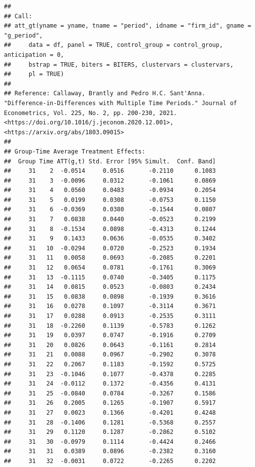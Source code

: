 \documentclass[
]{article}
\begin{document}
\begin{verbatim}
## 
## Call:
## att_gt(yname = yname, tname = "period", idname = "firm_id", gname = "g_period", 
##     data = df, panel = TRUE, control_group = control_group, anticipation = 0, 
##     bstrap = TRUE, biters = BITERS, clustervars = clustervars, 
##     pl = TRUE)
## 
## Reference: Callaway, Brantly and Pedro H.C. Sant'Anna.  "Difference-in-Differences with Multiple Time Periods." Journal of Econometrics, Vol. 225, No. 2, pp. 200-230, 2021. <https://doi.org/10.1016/j.jeconom.2020.12.001>, <https://arxiv.org/abs/1803.09015> 
## 
## Group-Time Average Treatment Effects:
##  Group Time ATT(g,t) Std. Error [95% Simult.  Conf. Band]  
##     31    2  -0.0514     0.0516       -0.2110      0.1083  
##     31    3  -0.0096     0.0312       -0.1061      0.0869  
##     31    4   0.0560     0.0483       -0.0934      0.2054  
##     31    5   0.0199     0.0308       -0.0753      0.1150  
##     31    6  -0.0369     0.0380       -0.1544      0.0807  
##     31    7   0.0838     0.0440       -0.0523      0.2199  
##     31    8  -0.1534     0.0898       -0.4313      0.1244  
##     31    9   0.1433     0.0636       -0.0535      0.3402  
##     31   10  -0.0294     0.0720       -0.2523      0.1934  
##     31   11   0.0058     0.0693       -0.2085      0.2201  
##     31   12   0.0654     0.0781       -0.1761      0.3069  
##     31   13  -0.1115     0.0740       -0.3405      0.1175  
##     31   14   0.0815     0.0523       -0.0803      0.2434  
##     31   15   0.0838     0.0898       -0.1939      0.3616  
##     31   16   0.0278     0.1097       -0.3114      0.3671  
##     31   17   0.0288     0.0913       -0.2535      0.3111  
##     31   18  -0.2260     0.1139       -0.5783      0.1262  
##     31   19   0.0397     0.0747       -0.1916      0.2709  
##     31   20   0.0826     0.0643       -0.1161      0.2814  
##     31   21   0.0088     0.0967       -0.2902      0.3078  
##     31   22   0.2067     0.1183       -0.1592      0.5725  
##     31   23  -0.1046     0.1077       -0.4378      0.2285  
##     31   24  -0.0112     0.1372       -0.4356      0.4131  
##     31   25  -0.0840     0.0784       -0.3267      0.1586  
##     31   26   0.2005     0.1265       -0.1907      0.5917  
##     31   27   0.0023     0.1366       -0.4201      0.4248  
##     31   28  -0.1406     0.1281       -0.5368      0.2557  
##     31   29   0.1120     0.1287       -0.2862      0.5102  
##     31   30  -0.0979     0.1114       -0.4424      0.2466  
##     31   31   0.0389     0.0896       -0.2382      0.3160  
##     31   32  -0.0031     0.0722       -0.2265      0.2202  

\end{verbatim}
\end{document}
